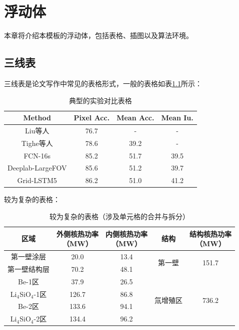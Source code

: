 \chapter{浮动体}
\label{cha:float}
本章将介绍本模板的浮动体，包括表格、插图以及算法环境。
\section{三线表}
\label{sec:sheet}
三线表是论文写作中常见的表格形式，一般的表格如表\ref{tab:siftflow}所示：
\begin{table}[h] 
	\renewcommand\arraystretch{1.5}
	\centering
		\caption{典型的实验对比表格}	
		\begin{tabular}{*{4}{c}}
			\toprule
	 		Method & Pixel Acc. & Mean Acc. & Mean Iu.\\
			\midrule
			Liu等人\cite{liu2011sift}  & 76.7 & - & -\\
			Tighe等人\cite{tighe2013finding}  & 78.6 & 39.2 & -\\
			FCN-16s\cite{long2015fully} & 85.2 & 51.7 & 39.5\\
			Deeplab-LargeFOV\cite{chen14semantic} & 85.6 & 51.2 & 39.7\\
			\midrule
			Grid-LSTM5 & 86.2 & 51.0 & 41.2\\
			\bottomrule
		\end{tabular}	
		\label{tab:siftflow}
\end{table}

较为复杂的表格：
\begin{table}[h]
	\renewcommand\arraystretch{1.5}
	\centering
	\caption{较为复杂的表格（涉及单元格的合并与拆分）}
	\begin{tabular}{*{5}{c}}
		\toprule
		区域 & \tabincell{c}{外侧核热功率\\（MW）} & \tabincell{c}{内侧核热功率\\（MW）} & 结构 & \tabincell{c}{结构核热功率\\（MW）} \\
		\midrule
		第一壁涂层 & 20.0 & 13.4 & \multirow{2}{*}{第一壁} & \multirow{2}{*}{151.7} \\
		第一壁结构层 & 70.2 & 48.1 & ~ & ~ \\
		\midrule
		Be-1区 & 37.9 & 26.5 & \multirow{4}{*}{氚增殖区} & \multirow{4}{*}{736.2} \\ 
		Li$ _{\text{4}} $SiO$ _{\text{4}} $-1区 & 126.7 & 86.8 & ~ & ~ \\
		Be-2区 & 133.6 & 94.1 & ~ & ~ \\
		Li$ _{\text{4}} $SiO$ _{\text{4}} $-2区 & 134.4 & 96.2 & ~ & ~ \\
		\bottomrule
	\end{tabular}
	\label{tab:nucheat_tot}
\end{table}

